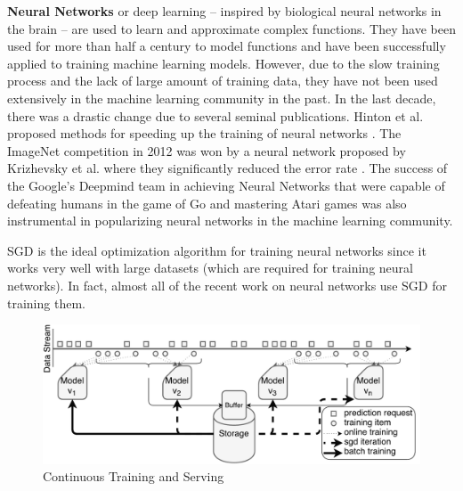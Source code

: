 \documentclass{vldb}
\begin{document}
\textbf{Neural Networks} or deep learning -- inspired by biological neural networks in the brain -- are used to learn and approximate complex functions. 
They have been used for more than half a century to model functions and have been successfully applied to training machine learning models.
However, due to the slow training process and the lack of large amount of training data, they have not been used extensively in the machine learning community in the past.
In the last decade, there was a drastic change due to several seminal publications.
Hinton et al. proposed methods for speeding up the training of neural networks \cite{hinton2006fast}.
The ImageNet competition \cite{ILSVRC15} in 2012 was won by a neural network proposed by Krizhevsky et al. where they significantly reduced the error rate \cite{krizhevsky2012imagenet}. 
The success of the Google's Deepmind team in achieving Neural Networks that were capable of defeating humans in the game of Go \cite{silver2016mastering} and mastering Atari games \cite{mnih2013playing} was also instrumental in popularizing neural networks in the machine learning community.

SGD is the ideal optimization algorithm for training neural networks since it works very well with large datasets (which are required for training neural networks).
In fact, almost all of the recent work on neural networks use SGD for training them.

\begin{figure}[t]
\centering
\includegraphics[width=\columnwidth]{../images/continuous-final.pdf}
\caption{Continuous Training and Serving}
\label{fig:cont-training-serving}
\end{figure}
\end{document}
